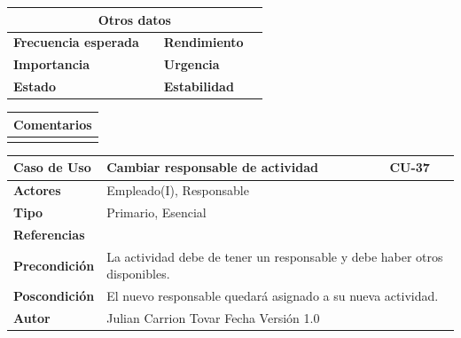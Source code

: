 \vspace{0.2cm}

\begin{table}[h!]
\centering
\begin{tabularx}{\textwidth}{|X|X|X|X|}
\hline
\multicolumn{4}{|c|}{\cellcolor[HTML]{F2F2F2}\textbf{Otros datos}} \\ \hline
\textbf{Frecuencia esperada} &  & \textbf{Rendimiento} &  \\ \hline
\textbf{Importancia} &  & \textbf{Urgencia} &  \\ \hline
\textbf{Estado} &  & \textbf{Estabilidad} &  \\ \hline
\end{tabularx}
\end{table}

\vspace{0.2cm}

\begin{table}[h!]
\centering
\begin{tabularx}{\textwidth}{|X|}
\hline
\cellcolor[HTML]{F2F2F2}\textbf{Comentarios} \\ \hline
\\ \hline
\end{tabularx}
\end{table}



\clearpage


\begin{table}[h!]
\centering
\begin{tabularx}{\textwidth}{|p{3cm}|p{8cm}|p{2cm}|}
\hline
\textbf{Caso de Uso} & Cambiar responsable de actividad & CU-37 \\ \hline
\textbf{Actores} & \multicolumn{2}{p{12cm}|}{Empleado(I), Responsable} \\ \hline
\textbf{Tipo} & \multicolumn{2}{p{12cm}|}{Primario, Esencial} \\ \hline
\textbf{Referencias} & \multicolumn{2}{p{12cm}|}{} \\ \hline
\textbf{Precondición} & \multicolumn{2}{p{12cm}|}{La actividad debe de tener un responsable y debe haber otros disponibles.} \\ \hline
\textbf{Poscondición} & \multicolumn{2}{p{12cm}|}{El nuevo responsable quedará asignado a su nueva actividad.} \\ \hline
\textbf{Autor} & \multicolumn{2}{p{10cm}|}{Julian Carrion Tovar \hfill Fecha \hfill Versión 1.0} \\ \hline
\end{tabularx}
\end{table}


